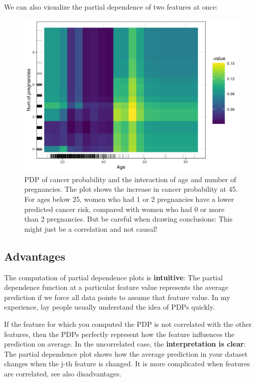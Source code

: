 \documentclass[12pt,]{krantz}
\begin{document}
We can also visualize the partial dependence of two features at once:

\begin{figure}

{\centering \includegraphics[width=\textwidth]{images/pdp-cervical-2d-1} 

}

\caption{PDP of cancer probability and the interaction of age and number of pregnancies. The plot shows the increase in cancer probability at 45. For ages below 25, women who had 1 or 2 pregnancies have a lower predicted cancer risk, compared with women who had 0 or more than 2 pregnancies. But be careful when drawing conclusions: This might just be a correlation and not causal!}\label{fig:pdp-cervical-2d}
\end{figure}

\subsection{Advantages}\label{advantages-5}

The computation of partial dependence plots is \textbf{intuitive}: The
partial dependence function at a particular feature value represents the
average prediction if we force all data points to assume that feature
value. In my experience, lay people usually understand the idea of PDPs
quickly.

If the feature for which you computed the PDP is not correlated with the
other features, then the PDPs perfectly represent how the feature
influences the prediction on average. In the uncorrelated case, the
\textbf{interpretation is clear}: The partial dependence plot shows how
the average prediction in your dataset changes when the j-th feature is
changed. It is more complicated when features are correlated, see also
disadvantages.
\end{document}
